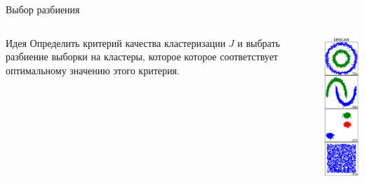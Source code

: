 \documentclass[10pt,a4paper]{beamer}
\begin{document}
\begin{frame}{Выбор разбиения}

\begin{columns}[T]

    \begin{column}{.8\textwidth}
    \vspace{5em}
   \begin{block}{Идея}
	Определить критерий качества кластеризации $J$ и выбрать разбиение выборки на 				кластеры, которое которое соответствует оптимальному значению этого критерия.
	\end{block}
    \end{column}
       
    \begin{column}{.2\textwidth}
    \includegraphics[scale=0.4]{images/dbscan.png}    
    \end{column}
  \end{columns}



\end{frame}

\end{document}
